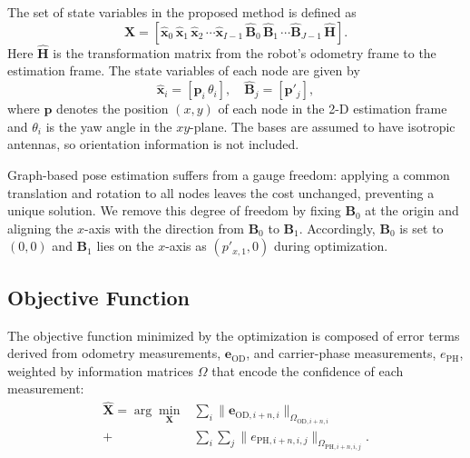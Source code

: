 \documentclass[conference]{IEEEtran}
\begin{document}
The set of state variables in the proposed method is defined as
\begin{equation}
    \mathbf{X} = \left[\mathbf{\hat{x}}_0\, \mathbf{\hat{x}}_1\, \mathbf{\hat{x}}_2\, \cdots \mathbf{\hat{x}}_{I-1}\, \mathbf{\hat{B}}_0\, \mathbf{\hat{B}}_1\, \cdots \mathbf{\hat{B}}_{J-1}\, \mathbf{\hat{H}}\right].
\end{equation}
Here $\mathbf{\hat{H}}$ is the transformation matrix from the robot's odometry frame to the estimation frame.
The state variables of each node are given by
\begin{equation}
   \mathbf{\hat{x}}_i = \left[\mathbf{p}_i\, \theta_{i}\right], \quad
   \mathbf{\hat{B}}_j = \left[\mathbf{p}'_j\right],
\end{equation}
where $\mathbf{p}$ denotes the position $(x,y)$ of each node in the 2-D estimation frame and $\theta_i$ is the yaw angle in the $xy$-plane.
The bases are assumed to have isotropic antennas, so orientation information is not included.

Graph-based pose estimation suffers from a gauge freedom: applying a common translation and rotation to all nodes leaves the cost unchanged, preventing a unique solution.
We remove this degree of freedom by fixing $\mathbf{B}_0$ at the origin and aligning the $x$-axis with the direction from $\mathbf{B}_0$ to $\mathbf{B}_1$.
Accordingly, $\mathbf{B}_0$ is set to $(0,0)$ and $\mathbf{B}_1$ lies on the $x$-axis as $(p'_{x,1}, 0)$ during optimization.

\subsection{Objective Function}
The objective function minimized by the optimization is composed of error terms derived from odometry measurements, $\mathbf{e}_{\mathrm{OD}}$, and carrier-phase measurements, $e_{\mathrm{PH}}$, weighted by information matrices $\Omega$ that encode the confidence of each measurement:
\begin{align}
    \hat{\mathbf{X}} = \arg\min_{\mathbf{X}} &\sum_{i}\|\mathbf{e}_{\mathrm{OD},i+n,i}\|_{\Omega_{\mathrm{OD},i+n,i}} \\
    +& \sum_{i}\sum_{j}\|e_{\mathrm{PH},i+n,i,j}\|_{\Omega_{\mathrm{PH},i+n,i,j}}.
\end{align}
\end{document}
